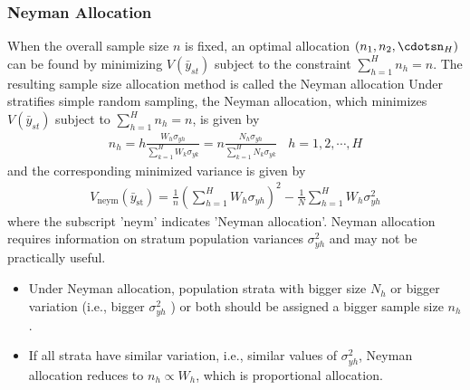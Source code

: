 \documentclass[a4paper,twoside,11pt]{article}
\begin{document}
{\subsubsection{Neyman Allocation}
When the overall sample size $n$ is fixed, an optimal allocation $(n_1,n_2,\cdotsn_H)$ can be found by minimizing $V(\bar{y}_{st})$ subject to the constraint $\sum^H_{h=1} n_h = n$. The resulting sample size allocation method is called the Neyman allocation
\newline
\newline
Under stratifies simple random sampling, the Neyman allocation, which minimizes $V(\bar{y}_{st})$ subject to $\sum^H_{h=1} n_h =n$, is given by
\begin{equation*}
\begin{aligned}
n_h = h \frac{W_h \sigma_{yh}}{\sum^H_{k=1} W_k \sigma_{yk}} = n \frac{N_h \sigma_{yh}}{\sum^H_{k=1} N_k \sigma_{yk}} \ \ \ \ h=1,2,\cdots, H
\end{aligned}
\end{equation*}
and the corresponding minimized variance is given by
\begin{equation*}
\begin{aligned}
V_{\text{neym}}(\bar{y}_{\text{st}} ) = \frac{1}{n} (\sum^H_{h=1} W_h \sigma_{yh} )^2 - \frac{1}{N} \sum^H_{h=1} W_h \sigma^2_{yh}
\end{aligned}
\end{equation*}
where the subscript 'neym' indicates 'Neyman allocation'.
\newline
\newline
Neyman allocation requires information on stratum population variances $\sigma_{yh}^2$ and may not be practically useful.
\begin{itemize}
    \item Under Neyman allocation, population strata with bigger size $N_h$ or bigger variation (i.e., bigger $\sigma^2_{yh}$ ) or both should be assigned a bigger sample size $n_h$.
    \item If all strata have similar variation, i.e., similar values of $\sigma_{yh}^2$, Neyman allocation
    reduces to $n_h \propto W_h$, which is proportional allocation.
\end{itemize}
}
\end{document}

